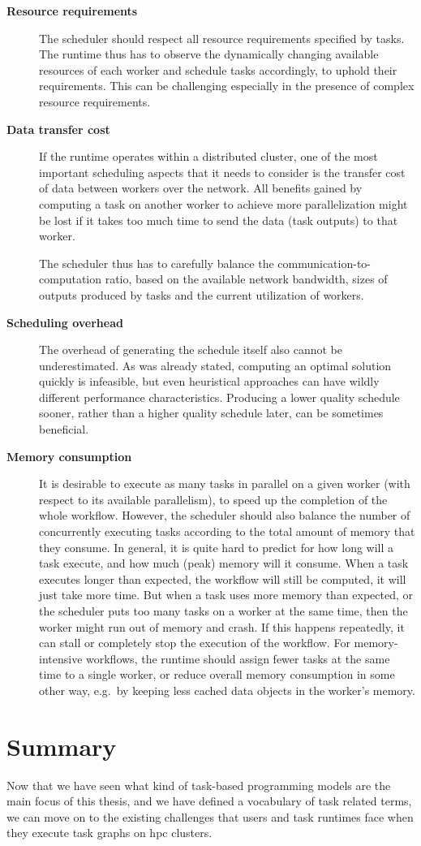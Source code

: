 \begin{description}
	\item[\textbf{Resource requirements}] The scheduler should respect all resource requirements specified by tasks. The runtime thus has to
		observe the dynamically changing available resources of each worker and schedule tasks accordingly,
		to uphold their requirements. This can be challenging especially in the presence of complex
		resource requirements.
	\item[\textbf{Data transfer cost}] If the runtime operates within a distributed cluster, one of the most important scheduling aspects
		that it needs to consider is the transfer cost of data between workers over the network. All
		benefits gained by computing a task on another worker to achieve more parallelization might be lost
		if it takes too much time to send the data (task outputs) to that worker.

		The scheduler thus has to carefully balance the communication-to-computation ratio, based on the
		available network bandwidth, sizes of outputs produced by tasks and the current utilization of
		workers.
	\item[\textbf{Scheduling overhead}] The overhead of generating the schedule itself also cannot be underestimated. As was already
		stated, computing an optimal solution quickly is infeasible, but even heuristical approaches can
		have wildly different performance characteristics. Producing a lower quality schedule sooner,
		rather than a higher quality schedule later, can be sometimes beneficial.
	\item[\textbf{Memory consumption}] It is desirable to execute as many tasks in parallel on a given worker (with respect to its
		available parallelism), to speed up the completion of the whole workflow. However, the scheduler
		should also balance the number of concurrently executing tasks according to the total amount of
		memory that they consume. In general, it is quite hard to predict for how long will a task execute,
		and how much (peak) memory will it consume. When a task executes longer than expected, the workflow
		will still be computed, it will just take more time. But when a task uses more memory than
		expected, or the scheduler puts too many tasks on a worker at the same time, then the worker might
		run out of memory and crash. If this happens repeatedly, it can stall or completely stop the
		execution of the workflow. For memory-intensive workflows, the runtime should assign fewer tasks at
		the same time to a single worker, or reduce overall memory consumption in some other way, e.g.\ by
		keeping less cached data objects in the worker's memory.
\end{description}

\section*{Summary}
Now that we have seen what kind of task-based programming models are the main focus of this thesis,
and we have defined a vocabulary of task related terms, we can move on to the existing challenges
that users and task runtimes face when they execute task graphs on \gls{hpc} clusters.

